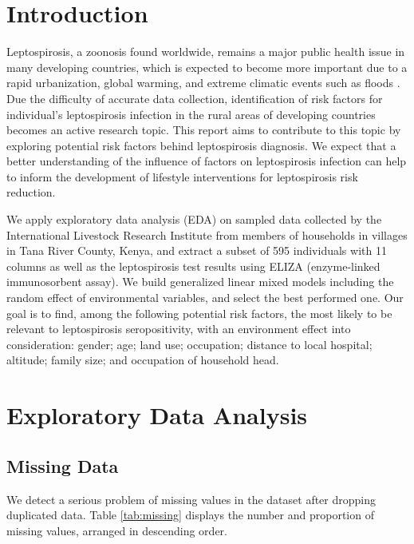 \documentclass[11pt,twoside]{article}
\numberwithin{Theorem}{section}
\numberwithin{Definition}{section}
\numberwithin{Lemma}{section}
\numberwithin{Algorithm}{section}
\numberwithin{equation}{section}
\begin{document}
\nocite{*}

\clearpage

\section{Introduction}
\label{sec:intro}

Leptospirosis, a zoonosis found worldwide, remains a major public health issue in many developing countries, which is expected to become more important due to a rapid urbanization, global warming, and extreme climatic events such as floods \cite{picardeau2013diagnosis}. Due the difficulty of accurate data collection, identification of risk factors for individual's leptospirosis infection in the rural areas of developing countries becomes an active research topic. This report aims to contribute to this topic by exploring potential risk factors behind leptospirosis diagnosis. We expect that a better understanding of the influence of factors on leptospirosis infection can help to inform the development of lifestyle interventions for leptospirosis risk reduction. 

We apply exploratory data analysis (EDA) on sampled data collected by the International Livestock Research Institute from members of households in villages in Tana River County, Kenya, and extract a subset of 595 individuals with 11 columns as well as the leptospirosis test results using ELIZA (enzyme-linked immunosorbent assay). We build generalized linear mixed models including the random effect of environmental variables, and select the best performed one. Our goal is to find, among the following potential risk factors, the most likely to be relevant to leptospirosis seropositivity, with an environment effect into consideration: gender; age; land use; occupation; distance to local hospital; altitude; family size; and occupation of household head.

\section{Exploratory Data Analysis}  
\label{sec: EDA}

\subsection{Missing Data}

We detect a serious problem of missing values in the dataset after dropping duplicated data. Table \ref{tab:missing} displays the number and proportion of missing values, arranged in descending order. 
\end{document}
